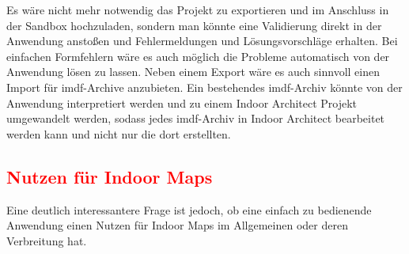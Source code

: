 Es wäre nicht mehr notwendig das Projekt zu exportieren und im Anschluss in der Sandbox hochzuladen, sondern man könnte eine Validierung direkt in der Anwendung anstoßen und Fehlermeldungen und Lösungsvorschläge erhalten.
Bei einfachen Formfehlern wäre es auch möglich die Probleme automatisch von der Anwendung lösen zu lassen.\pbreak%
%
Neben einem Export wäre es auch sinnvoll einen Import für \ac{imdf}-Archive anzubieten.
Ein bestehendes \ac{imdf}-Archiv könnte von der Anwendung interpretiert werden und zu einem Indoor Architect Projekt umgewandelt werden, sodass jedes \ac{imdf}-Archiv in Indoor Architect bearbeitet werden kann und nicht nur die dort erstellten.

\subsection{\textcolor{red}{Nutzen für Indoor Maps}}
Eine deutlich interessantere Frage ist jedoch, ob eine einfach zu bedienende Anwendung einen Nutzen für Indoor Maps im Allgemeinen oder deren Verbreitung hat.
